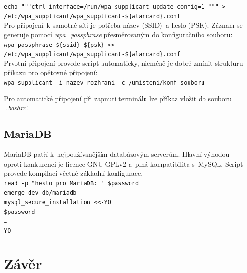 \documentclass[12pt,a4paper,twoside,]{article}
\begin{document}
{{{{{{\texttt{echo """ctrl\_interface=/run/wpa\_supplicant
	update\_config=1 """ > \hspace*{1.5em}/etc/wpa\_supplicant/wpa\_supplicant-\$\{wlancard\}.conf}\\

\hspace{-1.5em}Pro připojení~k samotné síti je potřeba název (SSID)~a heslo (PSK). Záznam se generuje pomocí \textit{wpa\_passphrase} přesměrovaným do konfiguračního souboru: \\

\texttt{wpa\_passphrase \$\{ssid\} \$\{psk\} >> \\\hspace*{1.5em}/etc/wpa\_supplicant/wpa\_supplicant-\$\{wlancard\}.conf}\\

\hspace{-1.5em}Prvotní připojení provede script automaticky, nicméně je dobré zmínit strukturu příkazu pro opětovné připojení:\\

\texttt{wpa\_supplicant -i nazev\_rozhrani -c /umisteni/konf\_souboru}

\hspace*{-1.5em}Pro automatické připojení při zapnutí terminálu lze příkaz vložit do souboru '\textit{.bashrc}'.
\subsection{\textsf{MariaDB}}
MariaDB patří k~nejpoužívanějším databázovým serverům. Hlavní výhodou oproti konkurenci je licence GNU GPLv2 a~plná kompatibilita s~MySQL. Script provede kompilaci včetně základní konfigurace.\\

\texttt{read -p "heslo pro MariaDB: " \$password}\\
\hspace*{1.5em}\texttt{emerge dev-db/mariadb}\\
\hspace*{1.5em}\texttt{mysql\_secure\_installation <<-YO}\\
\hspace*{3em}\texttt{\$password}\\
\hspace*{3em}\texttt{\dots}\\
\hspace*{1.5em}\texttt{YO}

\newpage
\section{\textsf{Závěr}}
\newpage
}}}}}}
\end{document}

